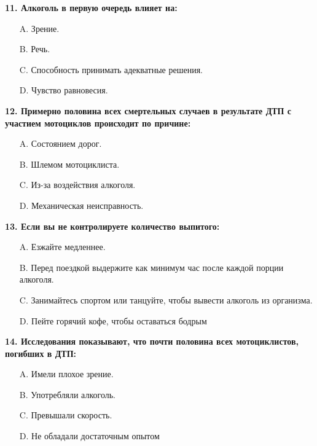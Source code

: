 \begin{minipage}{\linewidth}
\vspace{1em}\noindent\textbf{11. Алкоголь в первую очередь влияет на:}

\begin{itemize}[nosep,leftmargin=2em]
\item [A.] Зрение.
\item [B.] Речь.
\item [C.] Способность принимать адекватные решения.
\item [D.] Чувство равновесия.

\end{itemize}
\end{minipage}


\begin{minipage}{\linewidth}
\vspace{1em}\noindent\textbf{12. Примерно половина всех смертельных случаев в результате ДТП с участием мотоциклов происходит по причине:}

\begin{itemize}[nosep,leftmargin=2em]
\item [A.] Состоянием дорог.
\item [B.] Шлемом мотоциклиста.
\item [C.] Из-за воздействия алкоголя.
\item [D.] Механическая неисправность.

\end{itemize}
\end{minipage}


\begin{minipage}{\linewidth}
\vspace{1em}\noindent\textbf{13. Если вы не контролируете количество выпитого:}

\begin{itemize}[nosep,leftmargin=2em]
\item [A.] Езжайте медленнее.
\item [B.] Перед поездкой выдержите как минимум час после каждой порции алкоголя.
\item [C.] Занимайтесь спортом или танцуйте, чтобы вывести алкоголь из организма.
\item [D.] Пейте горячий кофе, чтобы оставаться бодрым

\end{itemize}
\end{minipage}


\begin{minipage}{\linewidth}
\vspace{1em}\noindent\textbf{14. Исследования показывают, что почти половина всех мотоциклистов, погибших в ДТП:}

\begin{itemize}[nosep,leftmargin=2em]
\item [A.] Имели плохое зрение.
\item [B.] Употребляли алкоголь.
\item [C.] Превышали скорость.
\item [D.] Не обладали достаточным опытом

\end{itemize}
\end{minipage}


